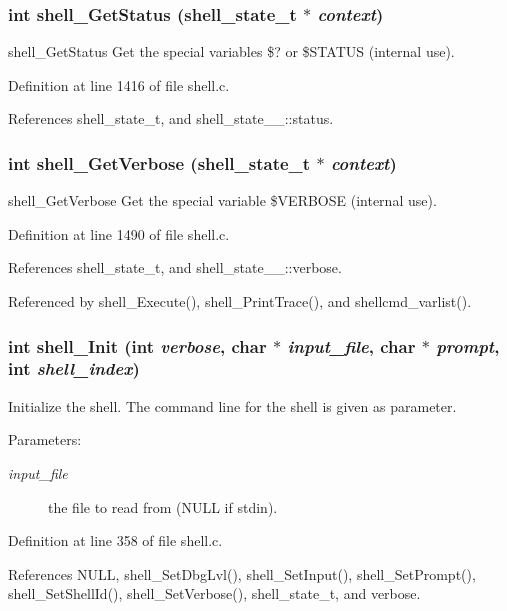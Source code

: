 \subsubsection{\setlength{\rightskip}{0pt plus 5cm}int shell\_\-Get\-Status ({\bf shell\_\-state\_\-t} $\ast$ {\em context})}\label{shell_8h_a20}


shell\_\-Get\-Status Get the special variables \$? or \$STATUS (internal use). 

Definition at line 1416 of file shell.c.

References shell\_\-state\_\-t, and shell\_\-state\_\-\_\-::status.
\subsubsection{\setlength{\rightskip}{0pt plus 5cm}int shell\_\-Get\-Verbose ({\bf shell\_\-state\_\-t} $\ast$ {\em context})}\label{shell_8h_a22}


shell\_\-Get\-Verbose Get the special variable \$VERBOSE (internal use). 

Definition at line 1490 of file shell.c.

References shell\_\-state\_\-t, and shell\_\-state\_\-\_\-::verbose.

Referenced by shell\_\-Execute(), shell\_\-Print\-Trace(), and shellcmd\_\-varlist().
\subsubsection{\setlength{\rightskip}{0pt plus 5cm}int shell\_\-Init (int {\em verbose}, char $\ast$ {\em input\_\-file}, char $\ast$ {\em prompt}, int {\em shell\_\-index})}\label{shell_8h_a8}


Initialize the shell. The command line for the shell is given as parameter. \begin{Desc}
\item[Parameters:]
\begin{description}
\item[{\em input\_\-file}]the file to read from (NULL if stdin). \end{description}
\end{Desc}


Definition at line 358 of file shell.c.

References NULL, shell\_\-Set\-Dbg\-Lvl(), shell\_\-Set\-Input(), shell\_\-Set\-Prompt(), shell\_\-Set\-Shell\-Id(), shell\_\-Set\-Verbose(), shell\_\-state\_\-t, and verbose.

